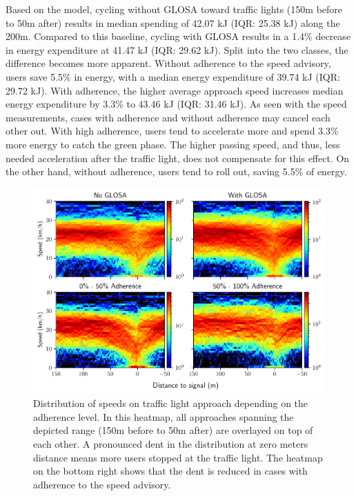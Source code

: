 Based on the model, cycling without GLOSA toward traffic lights (150m before to 50m after) results in median spending of 42.07 kJ (IQR: 25.38 kJ) along the 200m. Compared to this baseline, cycling with GLOSA results in a 1.4\% decrease in energy expenditure at 41.47 kJ (IQR: 29.62 kJ). Split into the two classes, the difference becomes more apparent. Without adherence to the speed advisory, users save 5.5\% in energy, with a median energy expenditure of 39.74 kJ (IQR: 29.72 kJ). With adherence, the higher average approach speed increases median energy expenditure by 3.3\% to 43.46 kJ (IQR: 31.46 kJ). As seen with the speed measurements, cases with adherence and without adherence may cancel each other out. With high adherence, users tend to accelerate more and spend 3.3\% more energy to catch the green phase. The higher passing speed, and thus, less needed acceleration after the traffic light, does not compensate for this effect. On the other hand, without adherence, users tend to roll out, saving 5.5\% of energy.

\begin{figure}[t]
\caption{Distribution of speeds on traffic light approach depending on the adherence level. In this heatmap, all approaches spanning the depicted range (150m before to 50m after) are overlayed on top of each other. A pronounced dent in the distribution at zero meters distance means more users stopped at the traffic light. The heatmap on the bottom right shows that the dent is reduced in cases with adherence to the speed advisory.}\label{fig:impacts-approach-speed-heatmap}
\includegraphics[width=\linewidth]{images/impacts-approach-speed-heatmap.pdf}
\end{figure}

